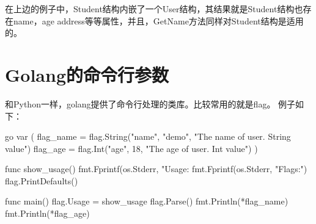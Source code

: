 在上边的例子中，Student结构内嵌了一个User结构，其结果就是Student结构也存在name，age
address等等属性，并且，GetName方法同样对Student结构是适用的。

\section{Golang的命令行参数}
和Python一样，golang提供了命令行处理的类库。比较常用的就是flag。
例子如下：
\begin{code-block}{go}
var (
    flag_name = flag.String("name", "demo", "The name of user. String value")
    flag_age  = flag.Int("age", 18, "The age of user. Int value")
)

func show_usage() {
    fmt.Fprintf(os.Stderr, "Usage: %
    fmt.Fprintf(os.Stderr, "Flags:\n")
    flag.PrintDefaults()
}

func main(){
    flag.Usage = show_usage
    flag.Parse()
    fmt.Println(*flag_name)
    fmt.Println(*flag_age)
}
\end{code-block}

